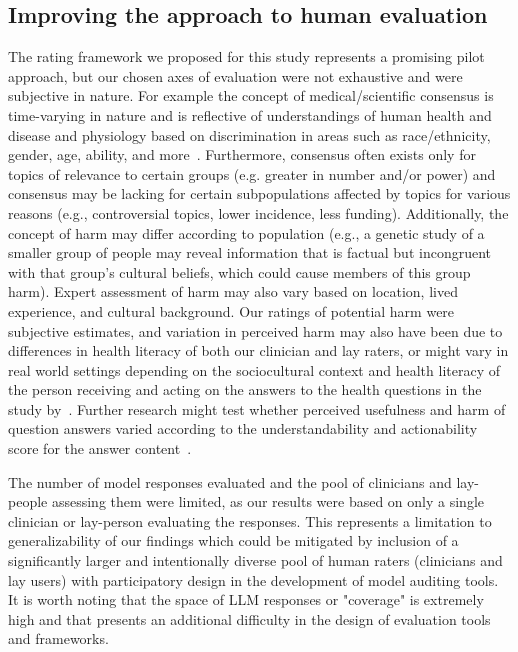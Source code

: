 \subsection{Improving the approach to human evaluation}

The rating framework we proposed for this study represents a promising pilot approach, but our chosen axes of evaluation were not exhaustive and were subjective in nature. For example the concept of medical/scientific consensus is time-varying in nature and is reflective of understandings of human health and disease and physiology based on discrimination in areas such as race/ethnicity, gender, age, ability, and more~\cite{kington2021identifying, Mandavilli2021Medical}. Furthermore, consensus often exists only for topics of relevance to certain groups (e.g. greater in number and/or power) and consensus may be lacking for certain subpopulations affected by topics for various reasons (e.g., controversial topics, lower incidence, less funding). Additionally, the concept of harm may differ according to population (e.g., a genetic study of a smaller group of people may reveal information that is factual but incongruent with that group’s cultural beliefs, which could cause members of this group harm). Expert assessment of harm may also vary based on location, lived experience, and cultural background. Our ratings of potential harm were subjective estimates, and variation in perceived harm may also have been due to differences in health literacy of both our clinician and lay raters, or might vary in real world settings depending on the sociocultural context and health literacy of the person receiving and acting on the answers to the health questions in the study by~\citet{berkman2011health}. Further research might test whether perceived usefulness and harm of question answers varied according to the understandability and actionability score for the answer content~\cite{shoemaker2014development}.

The number of model responses evaluated and the pool of clinicians and lay-people assessing them were limited, as our results were based on only a single clinician or lay-person evaluating the responses. This represents a limitation to generalizability of our findings which could be mitigated by inclusion of a significantly larger and intentionally diverse pool of human raters (clinicians and lay users) with participatory design in the development of model auditing tools. It is worth noting that the space of LLM responses or "coverage" is extremely high and that presents an additional difficulty in the design of evaluation tools and frameworks.

